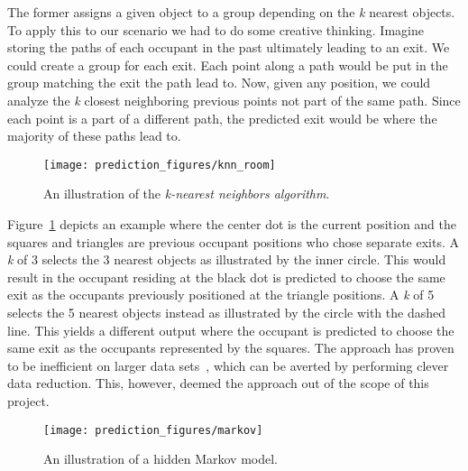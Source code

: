 The former assigns a given object to a group depending on the \emph{k} nearest objects. To apply this to our scenario we had to do some creative thinking. Imagine storing the paths of each occupant in the past ultimately leading to an exit. We could create a group for each exit. Each point along a path would be put in the group matching the exit the path lead to. Now, given any position, we could analyze the \emph{k} closest neighboring previous points not part of the same path. Since each point is a part of a different path, the predicted exit would be where the majority of these paths lead to.
\begin{figure}[htb]
\centering
\texttt{[image: prediction\_figures/knn\_room]}
\caption{An illustration of the \emph{k-nearest neighbors algorithm}.}
\label{fig:knn}
\end{figure}
Figure~\ref{fig:knn} depicts an example where the center dot is the current position and the squares and triangles are previous occupant positions who chose separate exits. A \emph{k} of 3 selects the 3 nearest objects as illustrated by the inner circle. This would result in the occupant residing at the black dot is predicted to choose the same exit as the occupants previously positioned at the triangle positions. A \emph{k} of 5 selects the 5 nearest objects instead as illustrated by the circle with the dashed line. This yields a different output where the occupant is predicted to choose the same exit as the occupants represented by the squares. The approach has proven to be inefficient on larger data sets~\cite{bhatia}, which can be averted by performing clever data reduction. This, however, deemed the approach out of the scope of this project.
\begin{figure}[htb]
\centering
\texttt{[image: prediction\_figures/markov]}
\caption{An illustration of a hidden Markov model.}
\label{fig:markov}
\end{figure}

